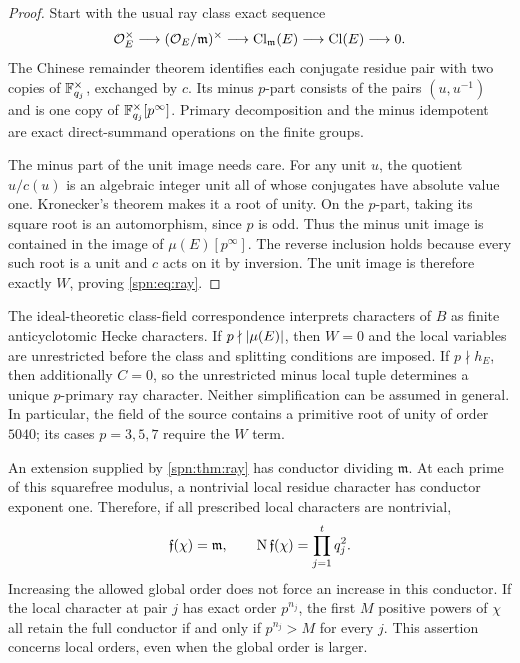 \begin{proof}
Start with the usual ray class exact sequence
\[
 \mathcal{O}_E^\times\longrightarrow(\mathcal{O}_E/\mathfrak m)^\times\longrightarrow
 \operatorname{Cl}_{\mathfrak m}(E)\longrightarrow\operatorname{Cl}(E)\longrightarrow0 .
\]
The Chinese remainder theorem identifies each conjugate residue pair with two
copies of $\mathbb{F}_{q_j}^\times$, exchanged by $c$. Its minus $p$-part consists of
the pairs $(u,u^{-1})$ and is one copy of $\mathbb{F}_{q_j}^\times[p^\infty]$.
Primary decomposition and the minus idempotent are exact direct-summand
operations on the finite groups.

The minus part of the unit image needs care. For any unit $u$, the quotient
$u/c(u)$ is an algebraic integer unit all of whose conjugates have absolute
value one. Kronecker's theorem makes it a root of unity. On the $p$-part,
taking its square root is an automorphism, since $p$ is odd. Thus the minus
unit image is contained in the image of $\mu(E)[p^\infty]$. The reverse
inclusion holds because every such root is a unit and $c$ acts on it by
inversion. The unit image is therefore exactly $W$, proving
\eqref{spn:eq:ray}.
\end{proof}

The ideal-theoretic class-field correspondence \cite{Milne2020CFT} interprets
characters of $B$ as finite anticyclotomic Hecke characters. If
$p\nmid\lvert\mu(E)\rvert$, then $W=0$ and the local variables are unrestricted
before the class and splitting conditions are imposed. If $p\nmid h_E$, then
additionally $C=0$, so the unrestricted minus local tuple determines a unique
$p$-primary ray character. Neither simplification can be assumed in general.
In particular, the field of the source contains a primitive root of unity of
order $5040$; its cases $p=3,5,7$ require the $W$ term.

An extension supplied by \cref{spn:thm:ray} has conductor dividing
$\mathfrak m$. At each prime of this squarefree modulus, a nontrivial local
residue character has conductor exponent one. Therefore, if all prescribed
local characters are nontrivial,
\begin{equation}\label{spn:eq:conductor}
 \mathfrak f(\chi)=\mathfrak m,\qquad
 \operatorname{N}\mathfrak f(\chi)=\prod_{j=1}^tq_j^2 .
\end{equation}
Increasing the allowed global order does not force an increase in this
conductor. If the local character at pair $j$ has exact order $p^{n_j}$, the
first $M$ positive powers of $\chi$ all retain the full conductor if and only
if $p^{n_j}>M$ for every $j$. This assertion concerns local orders, even when
the global order is larger.

